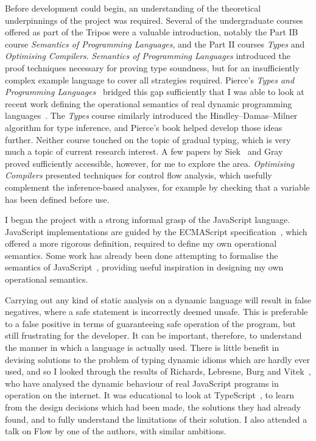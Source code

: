 \documentclass[12pt,a4paper,twoside,openright]{report}
\theoremstyle{definition}
\theoremstyle{dotless}
\begin{document}
Before development could begin, an understanding of the theoretical
underpinnings of the project was required. Several of the undergraduate courses
offered as part of the Tripos were a valuable introduction, notably the Part IB
course \textit{Semantics of Programming Languages}, and the Part II courses
\textit{Types} and \textit{Optimising Compilers}. \textit{Semantics of
  Programming Languages} introduced the proof techniques necessary for proving
type soundness, but for an insufficiently complex example language to cover all
strategies required. Pierce's \textit{Types and Programming
  Languages}~\cite{pierce} bridged this gap sufficiently that I was able to look
at recent work defining the operational semantics of real dynamic programming
languages~\cite{pythonOpSem}. The \textit{Types} course similarly introduced
the Hindley--Damas--Milner algorithm for type inference, and Pierce's book
helped develop those ideas further. Neither course touched on the topic of
gradual typing, which is very much a topic of current research interest. A few
papers by Siek~\cite{gradSiek, gradSiek2} and Gray~\cite{gradGray} proved
sufficiently accessible, however, for me to explore the area.
\textit{Optimising Compilers} presented techniques for control flow analysis,
which usefully complement the inference-based analyses, for example by checking
that a variable has been defined before use.

I began the project with a strong informal grasp of the JavaScript language.
JavaScript implementations are guided by the ECMAScript
specification~\cite{ecmaSpec}, which offered a more rigorous definition,
required to define my own operational semantics. Some work has already been
done attempting to formalise the semantics of
JavaScript~\cite{guha2010essence}, providing useful inspiration in designing my
own operational semantics. 

Carrying out any kind of static analysis on a dynamic language will result in
false negatives, where a safe statement is incorrectly deemed unsafe. This is
preferable to a false positive in terms of guaranteeing safe operation of the
program, but still frustrating for the developer. It can be important,
therefore, to understand the manner in which a language is actually used. There
is little benefit in devising solutions to the problem of typing dynamic idioms
which are hardly ever used, and so I looked through the results of Richards,
Lebresne, Burg and Vitek~\cite{JSBehaviour}, who have analysed the dynamic
behaviour of real JavaScript programs in operation on the internet. It
was educational to look at TypeScript~\cite{ts,understandingTS}, to learn from
the design decisions which had been made, the solutions they had already found,
and to fully understand the limitations of their solution. I also attended a
talk on Flow by one of the authors, with similar ambitions.
\end{document}
